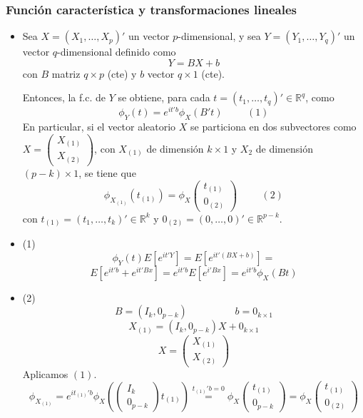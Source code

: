 \documentclass[11pt,a4paper]{article}
\begin{document}
\subsubsection{Función característica y transformaciones lineales}
\begin{itemize}
\item Sea $X = (X_{1}, \dots, X_{p})'$ un vector $p$-dimensional, y sea $Y = (Y_{1}, \dots, Y_{q})'$ un vector $q$-dimensional definido como
$$Y = BX + b$$
con $B$ matriz $q \times p$ (cte) y $b$ vector $q \times 1$ (cte).

Entonces, la f.c. de $Y$ se obtiene, para cada $t = (t_{1}, \dots, t_{q})' \in \mathbb{R}^{q}$, como
$$\phi_{Y}(t) = e^{it'b} \phi_{X}(B't) \hspace{1cm} (1)$$
En particular, si el vector aleatorio $X$ se particiona en dos subvectores como $X = \begin{pmatrix} X_{(1)} \\ X_{(2)} \end{pmatrix}$, con $X_{(1)}$ de dimensión $k \times 1$ y $X_{2}$ de dimensión $(p-k) \times 1$, se tiene que
$$\phi_{X_{(1)}}(t_{(1)}) = \phi_{X} \begin{pmatrix} t_{(1)} \\ 0_{(2)} \end{pmatrix} \hspace{1cm} (2)$$
con $t_{(1)} = (t_{1}, \dots, t_{k})' \in \mathbb{R}^{k}$ y $0_{(2)} = (0, \dots, 0)' \in \mathbb{R}^{p-k}$.

\item (1) $$\phi_{Y}(t) E[e^{it'Y}] = E[e^{it'(BX+b)}] =$$
$$E[e^{it'b} + e^{it'Bx}] = e^{it'b}E[e^{i'Bx}] = e^{it'b} \phi_{X}(Bt)$$

\item (2) $$B = (I_{k}, 0_{p-k}) \hspace{2cm} b = 0_{k \times 1}$$
$$X_{(1)} = (I_{k}, 0_{p-k})X + 0_{k \times 1}$$
$$X = \begin{pmatrix} X_{(1)} \\ X_{(2)} \end{pmatrix}$$
Aplicamos $(1)$.
$$\phi_{X_{(1)}} = e^{it_{(1)}'b} \phi_{X} (\begin{pmatrix} I_{k} \\ 0_{p-k} \end{pmatrix} t_{(1)}) \overset{t_{(1)}'b=0}{=} \phi_{X} \begin{pmatrix} t_{(1)} \\ 0_{p-k} \end{pmatrix} = \phi_{X} \begin{pmatrix} t_{(1)} \\ 0_{(2)} \end{pmatrix}$$
\end{itemize}
\end{document}
